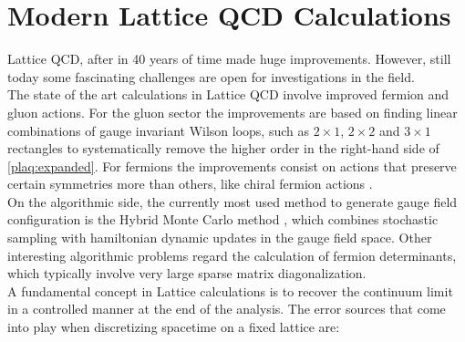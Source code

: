 \section{Modern Lattice QCD Calculations}
Lattice QCD, after in 40 years of time made huge improvements. However, still today some fascinating challenges are open for investigations in the field. \\
The state of the art calculations in Lattice QCD involve improved fermion and gluon actions. For the gluon sector the improvements are based on finding linear combinations of gauge invariant Wilson loops, such as $2\times 1$, $2\times 2$ and $3\times 1$ rectangles to systematically remove the higher order in the right-hand side of \cref{plaq:expanded}. For fermions the improvements consist on actions that preserve certain symmetries more than others, like chiral fermion actions \cite{degrand_chiral_2007}.\\
On the algorithmic side, the currently most used method to generate gauge field configuration is the Hybrid Monte Carlo method \cite{alles_hybrid_1996}, which combines stochastic sampling with hamiltonian dynamic updates in the  gauge field space. Other interesting algorithmic problems regard the calculation of fermion determinants, which typically involve very large sparse matrix diagonalization.\\
A fundamental concept in Lattice calculations is to recover the continuum limit in a controlled manner at the end of the analysis. The error sources that come into play when discretizing spacetime on a fixed lattice are:
